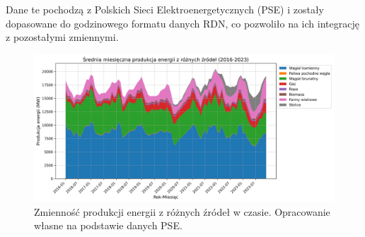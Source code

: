 Dane te pochodzą z Polskich Sieci Elektroenergetycznych (PSE) \cite{PSEOLD} i zostały dopasowane do godzinowego formatu danych RDN, co pozwoliło na ich integrację z pozostałymi zmiennymi. 
\begin{figure}[H]
    \centering
    \includegraphics[width=1.0\textwidth]{../plots/energy/energy_production_time_series_full.png}
    \caption{Zmienność produkcji energii z różnych źródeł w czasie. Opracowanie własne na podstawie danych PSE.}
    \label{fig:energy-production-time-series-full}
\end{figure}

